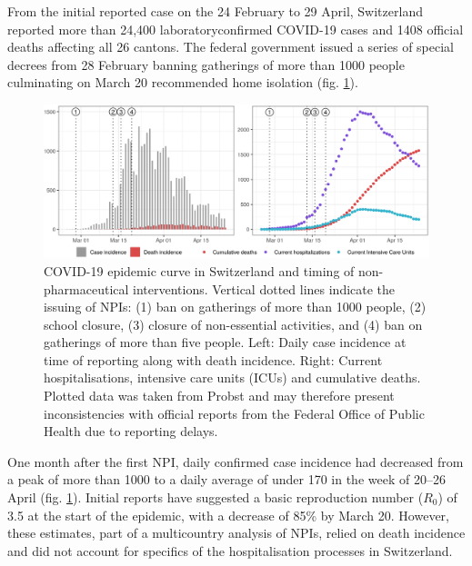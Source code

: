 From the initial reported case on the 24 February to 29 April, Switzerland reported more than 24,400 laboratoryconfirmed COVID-19 cases and 1408 official deaths affecting all 26 cantons\cite{OFSP:RapportSituationEpidemiologique:2020}. The federal government issued a series of special decrees from 28 February banning gatherings of more than 1000 people culminating on March 20 recommended home isolation (fig. \ref{fig:covid-ch-data}). 
\begin{figure}\centering
  \includegraphics[width=\textwidth]{fig_covid-switzerland-npi/FIGURE_1.png}
  \caption[COVID-19 epidemic curve in Switzerland and timing of interventions.]{COVID-19 epidemic curve in Switzerland and timing of non-pharmaceutical interventions. Vertical dotted lines indicate the issuing of NPIs: (1) ban on gatherings of more than 1000 people, (2) school closure, (3) closure of non-essential activities, and (4) ban on gatherings of more than five people. Left: Daily case incidence at time of reporting along with death incidence. Right: Current hospitalisations, intensive care units (ICUs) and cumulative deaths. Plotted data was taken from Probst \parencite{Probst:DaenuprobstCovid19casesswitzerland:2020}and may therefore present inconsistencies with official reports from the Federal Office of Public Health due to reporting delays.}
  \label{fig:covid-ch-data}
\end{figure}
One month after the first NPI, daily confirmed case incidence had decreased from a peak of more than 1000 to a daily average of under 170 in the week of 20–26 April (fig. \ref{fig:covid-ch-data}). Initial reports have suggested a basic reproduction number ($R_0$) of 3.5 at the start of the epidemic, with a decrease of 85\% by March 20\cite{Flaxman:Report13Estimating:2020}. However, these estimates, part of a multicountry analysis of NPIs, relied on death incidence and did not account for specifics of the hospitalisation processes in Switzerland. 
